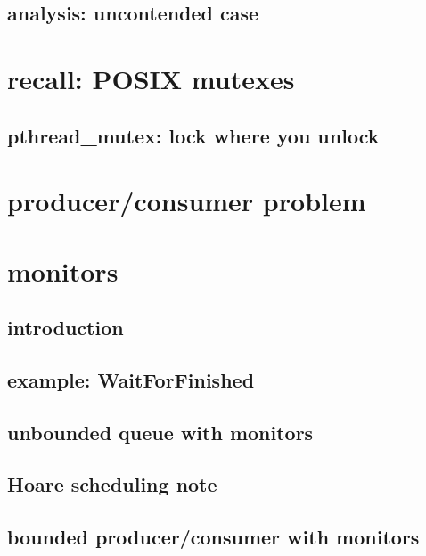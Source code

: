 \subsection{analysis: uncontended case}


\section{recall: POSIX mutexes}


\subsection{pthread\_mutex: lock where you unlock}


\section{producer/consumer problem}


\section{monitors}

\subsection{introduction}

\subsection{example: WaitForFinished}


\subsection{unbounded queue with monitors}


\subsection{Hoare scheduling note}


\subsection{bounded producer/consumer with monitors}
 

